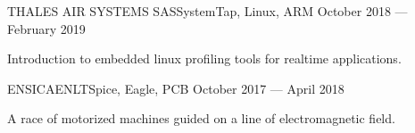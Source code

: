 \documentclass{faresume}
\begin{document}
\begin{column}[\leftcolumnwidth]
			{THALES AIR SYSTEMS SAS}{SystemTap, Linux, ARM}
			{October 2018 --- February 2019}
			{
				\begin{additems}
					\item Introduction to embedded linux profiling tools for realtime applications.
				\end{additems}
			}

			{ENSICAEN}{LTSpice, Eagle, PCB}
			{October 2017 --- April 2018}
			{
				\begin{additems}
					\item A race of motorized machines guided on a line of electromagnetic field.
				\end{additems}
			}

\end{column}
\end{document}
